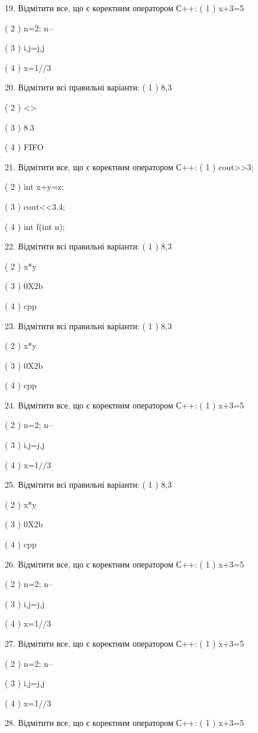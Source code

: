 \documentclass[11pt]{article}
\begin{document}
19. Відмітити все, що є коректним оператором С++:
( 1 ) x+3=5

( 2 ) n=2; n--

( 3 ) i,j=j,j

( 4 ) x=1//3

20. Відмітити всі правильні варіанти:
( 1 ) 8,3

( 2 ) <>

( 3 ) 8.3

( 4 ) FIFO

21. Відмітити все, що є коректним оператором С++:
( 1 ) cout>>3;

( 2 ) int x+y=z;

( 3 ) cout<<3.4;

( 4 ) int f(int n);

22. Відмітити всі правильні варіанти:
( 1 ) 8,3

( 2 ) x*y

( 3 ) 0X2b

( 4 ) cpp

23. Відмітити всі правильні варіанти:
( 1 ) 8,3

( 2 ) x*y

( 3 ) 0X2b

( 4 ) cpp

24. Відмітити все, що є коректним оператором С++:
( 1 ) x+3=5

( 2 ) n=2; n--

( 3 ) i,j=j,j

( 4 ) x=1//3

25. Відмітити всі правильні варіанти:
( 1 ) 8,3

( 2 ) x*y

( 3 ) 0X2b

( 4 ) cpp

26. Відмітити все, що є коректним оператором С++:
( 1 ) x+3=5

( 2 ) n=2; n--

( 3 ) i,j=j,j

( 4 ) x=1//3

27. Відмітити все, що є коректним оператором С++:
( 1 ) x+3=5

( 2 ) n=2; n--

( 3 ) i,j=j,j

( 4 ) x=1//3

28. Відмітити все, що є коректним оператором С++:
( 1 ) x+3=5
\end{document}
